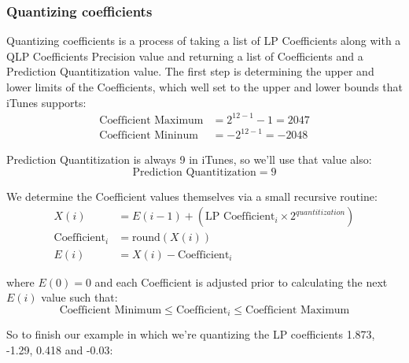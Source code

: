 \subsubsection{Quantizing coefficients}

Quantizing coefficients is a process of taking a list of LP Coefficients
along with a QLP Coefficients Precision value and
returning a list of Coefficients and a Prediction Quantitization value.
The first step is determining the upper and lower limits of the
Coefficients, which well set to the upper and lower bounds that iTunes
supports:
\begin{align}
\text{Coefficient Maximum} &= 2 ^ {12 - 1} - 1 = 2047\\
\text{Coefficient Mininum} &= - 2 ^ {12 - 1} = -2048
\end{align}
\par
\noindent
Prediction Quantitization is always 9 in iTunes, so we'll use that value also:
\begin{equation}
\text{Prediction Quantitization} = 9
\end{equation}
\par
\noindent
We determine the Coefficient values themselves via a small
recursive routine:
\begin{align}
X(i) &= E(i - 1) + (\text{LP Coefficient}_i \times 2 ^ {quantitization}) \\
\text{Coefficient}_i &= \text{round}(X(i)) \\
E(i) &= X(i) - \text{Coefficient}_i
\end{align}
\par
\noindent
where $E(0) = 0$ and each Coefficient is adjusted
prior to calculating the next $E(i)$ value such that:
\begin{equation}
\text{Coefficient Minimum} \leq \text{Coefficient}_i \leq \text{Coefficient Maximum}
\end{equation}
\par
So to finish our example in which we're quantizing the LP
coefficients 1.873, -1.29, 0.418 and -0.03:
